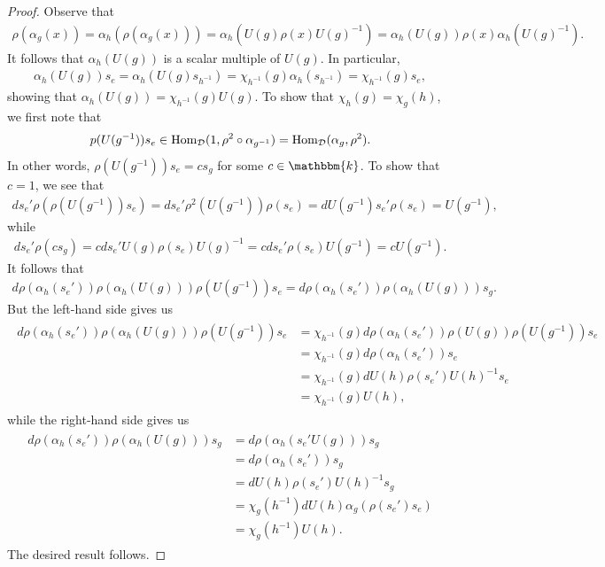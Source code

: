 \noindent\begin{proof} Observe that
\begin{align*}
\rho(\alpha_g(x)) = \alpha_h(\rho(\alpha_g(x))) = \alpha_h(U(g)\rho(x)U(g)^{-1}) = \alpha_h(U(g))\rho(x)\alpha_h(U(g)^{-1}).
\end{align*}
\noindent It follows that $\alpha_h(U(g))$ is a scalar multiple of $U(g)$. In particular,
\begin{align*}
\alpha_h(U(g))s_e = \alpha_h(U(g)s_{h^{-1}}) = \chi_{h^{-1}}(g)\alpha_h(s_{h^{-1}}) = \chi_{h^{-1}}(g)s_e,
\end{align*}
\noindent showing that $\alpha_h(U(g)) = \chi_{h^{-1}}(g)U(g)$. To show that $\chi_h(g) = \chi_g(h)$, we first note that
\begin{align*}
p(U(g^{-1}))s_e \in \textup{Hom}_\mathcal{D}(1, \rho^2 \circ \alpha_{g^{-1}}) = \textup{Hom}_\mathcal{D}(\alpha_g, \rho^2).
\end{align*}
\noindent In other words, $\rho(U(g^{-1}))s_e = c s_g$ for some $c \in \mathbbm{k}$. To show that $c = 1$, we see that
\begin{align*}
{d} s_e'\rho(\rho(U(g^{-1}))s_e) = {d} s_e'\rho^2(U(g^{-1}))\rho(s_e) = {d} U(g^{-1})s_e'\rho(s_e) = U(g^{-1}),
\end{align*}
\noindent while
\begin{align*}
{d} s_e'\rho(c s_g) = c{d} s_e'U(g)\rho(s_e)U(g)^{-1} = c{d} s_e'\rho(s_e)U(g^{-1}) = c U(g^{-1}).
\end{align*}
\noindent It follows that
\begin{align*}
{d}\rho(\alpha_h(s_e'))\rho(\alpha_h(U(g)))\rho(U(g^{-1}))s_e = {d}\rho(\alpha_h(s_e'))\rho(\alpha_h(U(g)))s_g.
\end{align*}
\noindent But the left-hand side gives us
\begin{align*}
\begin{split}
{d}\rho(\alpha_h(s_e'))\rho(\alpha_h(U(g)))\rho(U(g^{-1}))s_e &= \chi_{h^{-1}}(g){d}\rho(\alpha_h(s_e'))\rho(U(g))\rho(U(g^{-1}))s_e\\
&= \chi_{h^{-1}}(g){d}\rho(\alpha_h(s_e'))s_e\\
&= \chi_{h^{-1}}(g){d} U(h)\rho(s_e')U(h)^{-1}s_e\\
&= \chi_{h^{-1}}(g)U(h),
\end{split}
\end{align*}
\noindent while the right-hand side gives us
\begin{align*}
\begin{split}
{d}\rho(\alpha_h(s_e'))\rho(\alpha_h(U(g)))s_g &= {d}\rho(\alpha_h(s_e'U(g)))s_g\\
&= {d}\rho(\alpha_h(s_e'))s_g\\
&= {d} U(h)\rho(s_e')U(h)^{-1}s_g\\
&= \chi_g(h^{-1}){d} U(h)\alpha_g(\rho(s_e')s_e)\\
&= \chi_g(h^{-1})U(h).
\end{split}
\end{align*}
\noindent The desired result follows. %
\end{proof}\\


